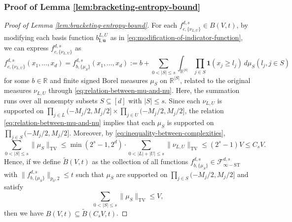 \documentclass[10pt]{article}
\newcommand{\R}{{\mathbb R}}
\newcommand{\fstinf}{{\mathcal{F}^{d, s}_{\infty-\text{ST}}}}
\newcommand{\fcnu}{{f^{d, s}_{c, \{\nu_{L, U}\}}}}
\newcommand{\lbf}{{\mathbf{l}}}
\newcommand{\ubf}{{\mathbf{u}}}
\newcommand{\ind}{{\mathbf{1}}}
\begin{document}
\subsubsection{Proof of Lemma \ref{lem:bracketing-entropy-bound}}
\label{pf:bracketing-entropy-bound}

\begin{proof}[Proof of Lemma \ref{lem:bracketing-entropy-bound}]
    For each $\fcnu \in B(V, t)$, by modifying each 
basis function $b^{L, U}_{\lbf, \ubf}$ as in 
\eqref{eq:modification-of-indicator-function},
we can express $\fcnu$ as
\begin{equation}\label{eq:expression-of-f-b-mu-S}
    \fcnu(x_1, \dots, x_d) 
    = f^{d, s}_{b, \{\mu_S\}}(x_1, \dots, x_d) 
    := b + \sum_{0 < |S| \le s} 
    \int_{\R^{|S|}} \prod_{j \in S} \ind(x_j \ge l_j)
    \, d\mu_S(l_j, j \in S) 
\end{equation}
for some $b \in \R$ and finite signed Borel measures $\mu_S$ 
on $\R^{|S|}$, related to the original measures $\nu_{L, U}$ 
through \eqref{eq:relation-between-mu-and-nu}. 
Here, the summation runs over all nonempty subsets  
$S \subseteq [d]$ with $|S| \le s$.
Since each $\nu_{L, U}$ is supported on $\prod_{j \in L} (-M_j/2, M_j/2] 
\times \prod_{j \in U} (-M_j/2, M_j/2]$, the relation 
\eqref{eq:relation-between-mu-and-nu} implies that each $\mu_S$ is 
supported on $\prod_{j \in S} (-M_j/2, M_j/2]$. 
Moreover, by \eqref{eq:inequality-between-complexities}, 
\begin{equation*}
    \sum_{0 < |S| \le s} \|\mu_S\|_{\text{TV}}
    \le \min(2^s - 1, 2^d) \cdot \sum_{0 < |L| + |U| \le s} 
    \|\nu_{L, U}\|_{\text{TV}}
    \le (2^s - 1) V
    \le C_s V.
\end{equation*}
Hence, if we define $\widetilde{B}(V, t)$ as the collection of all 
functions $f^{d, s}_{b, \{\mu_S\}} \in \fstinf$ with 
$\|f^{d, s}_{b, \{\mu_S\}}\|_{p_0, 2} \le t$ such that $\mu_S$ are supported 
on $\prod_{j \in S} (-M_j/2, M_j/2]$ and satisfy
\begin{equation*}
    \sum_{0 < |S| \le s} \|\mu_S\|_{\text{TV}} \le V,
\end{equation*}
then we have $B(V, t) \subseteq \widetilde{B}(C_s V, t)$. 


\end{proof}
\end{document}
